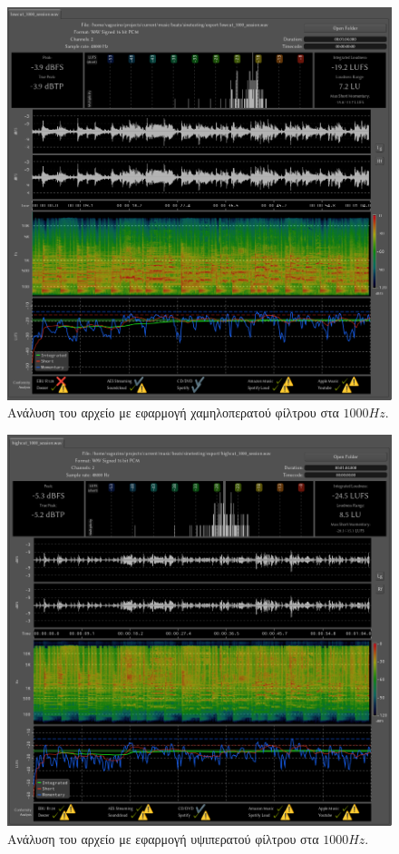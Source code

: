 \documentclass{article}
\begin{document}
\begin{figure}[htpb]
    \centering
    \includegraphics[width=\textwidth]{./assets/session_1000_lp.png}
    \caption{Ανάλυση του αρχείο  με εφαρμογή χαμηλοπερατού φίλτρου στα $1000Hz$.}
    \label{fig:sessionanalysislp1000}
\end{figure}

\begin{figure}[htpb]
    \centering
    \includegraphics[width=\textwidth]{./assets/session_1000_hp.png}
    \caption{Ανάλυση του αρχείο  με εφαρμογή υψιπερατού φίλτρου στα $1000Hz$.}
    \label{fig:sessionanalysishp1000}
\end{figure}


\newpage


\end{document}

